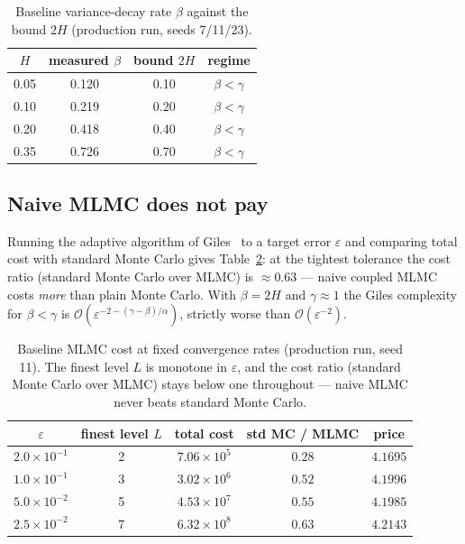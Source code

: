 \documentclass[11pt]{article}
\newcommand{\bA}{0.120}
\newcommand{\bB}{0.219}
\newcommand{\bC}{0.418}
\newcommand{\bD}{0.726}
\newcommand{\costratio}{0.63}
\begin{document}
\begin{table}[t]
\centering
\caption{Baseline variance-decay rate $\beta$ against the bound $2H$ (production run, seeds
7/11/23).}
\label{tab:betaH}
\begin{tabular}{cccc}
\toprule
$H$ & measured $\beta$ & bound $2H$ & regime \\
\midrule
0.05 & \bA & 0.10 & $\beta<\gamma$ \\
0.10 & \bB & 0.20 & $\beta<\gamma$ \\
0.20 & \bC & 0.40 & $\beta<\gamma$ \\
0.35 & \bD & 0.70 & $\beta<\gamma$ \\
\bottomrule
\end{tabular}
\end{table}

\subsection{Naive MLMC does not pay}
Running the adaptive algorithm of Giles~\cite{giles2008} to a target error $\varepsilon$
and comparing total cost with standard Monte Carlo gives Table~\ref{tab:cost}: at the
tightest tolerance the cost ratio (standard Monte Carlo over MLMC) is $\approx\costratio$
--- naive coupled MLMC costs \emph{more} than plain Monte Carlo. With $\beta=2H$ and
$\gamma\approx1$ the Giles complexity for $\beta<\gamma$ is
$\mathcal{O}(\varepsilon^{-2-(\gamma-\beta)/\alpha})$, strictly worse than
$\mathcal{O}(\varepsilon^{-2})$.

\begin{table}[t]
\centering
\caption{Baseline MLMC cost at fixed convergence rates (production run, seed 11). The finest
level $L$ is monotone in $\varepsilon$, and the cost ratio (standard Monte Carlo over MLMC)
stays below one throughout --- naive MLMC never beats standard Monte Carlo.}
\label{tab:cost}
\begin{tabular}{ccccc}
\toprule
$\varepsilon$ & finest level $L$ & total cost & std MC / MLMC & price \\
\midrule
$2.0\times10^{-1}$ & 2 & $7.06\times10^{5}$ & $0.28$ & $4.1695$ \\
$1.0\times10^{-1}$ & 3 & $3.02\times10^{6}$ & $0.52$ & $4.1996$ \\
$5.0\times10^{-2}$ & 5 & $4.53\times10^{7}$ & $0.55$ & $4.1985$ \\
$2.5\times10^{-2}$ & 7 & $6.32\times10^{8}$ & $0.63$ & $4.2143$ \\
\bottomrule
\end{tabular}
\end{table}
\end{document}
